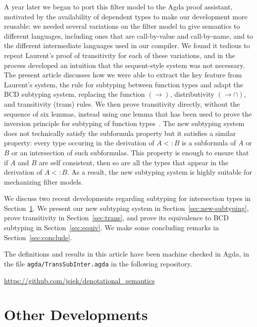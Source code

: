 \documentclass{article}
\begin{document}
A year later we began to port this filter model to the Agda proof
assistant, motivated by the availability of dependent types to make
our development more reusable: we needed several variations on the
filter model to give semantics to different languages, including ones
that are call-by-value and call-by-name, and to the different
intermediate languages used in our compiler. We found it tedious to
repeat Laurent's proof of transitivity for each of these variations,
and in the process developed an intuition that the sequent-style
system was not necessary. The present article discusses how we were
able to extract the key feature from Laurent's system, the rule for
subtyping between function types and adapt the BCD subtyping system,
replacing the function $(\to)$, distributivity $({\to}{\cap})$, and
transitivity (trans) rules.  We then prove transitivity directly,
without the sequence of six lemmas, instead using one lemma that has
been used to prove the inversion principle for subtyping of function
types~\citep{Barendregt:2013aa}. The new subtyping system does not
technically satisfy the subformula property but it satisfies a similar
property: every type occuring in the derivation of $A <: B$ is a
subformula of $A$ or $B$ or an intersection of such subformulas.
This property is enough to ensure that if $A$ and $B$ are self
consistent, then so are all the types that appear in the derivation of
$A <: B$. As a result, the new subtyping system is highly suitable for
mechanizing filter models.

We discuss two recent developments regarding subtyping for
intersection types in Section~\ref{sec:other-developments}.  We
present our new subtyping system in Section~\ref{sec:new-subtyping},
prove transitivity in Section~\ref{sec:trans}, and prove its
equivalence to BCD subtyping in Section~\ref{sec:equiv}. We make some
concluding remarks in Section~\ref{sec:conclude}.

The definitions and results in this article have been machine checked
in Agda, in the file \texttt{agda/TransSubInter.agda} in the following
repository.

\begin{center}
  \url{https://github.com/jsiek/denotational_semantics}
\end{center}

\section{Other Developments}
\label{sec:other-developments}
\end{document}
